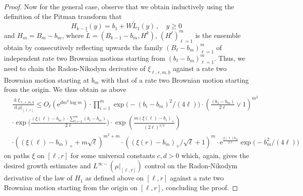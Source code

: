 \documentclass[11pt, reqno]{amsart}
\numberwithin{equation}{section}
\newcommand{\diff}{\ensuremath{\operatorname{d}\!}}
\begin{document}
\begin{proof}
    Now for the general case, observe that we obtain inductively using the definition of the Pitman transform that
     \[
H_{k-1}(y) = b_1 + W\tilde{L}_1(y)\,,\quad y\ge 0
    \]
    and $H_m = B_m-b_m$, where $\tilde{L} = (B_{k-1}-b_m, H^{k})$, $(H^{\ell})^m_{\ell=1}$ is the ensemble obtain by consecutively reflecting upwards the family $(B_\ell-b_m)_{\ell=1}^m$ of independent rate two Brownian motions starting from $(b_\ell-b_m)_{\ell=1}^m$. Thus, we need to chain the Radon-Nikodym  derivative of $\xi_{\ell, r, m, \underline{b}}$ against a rate two Brownian motion starting at $b_m$ with that of a rate two Brownian motion starting from the origin. We thus obtain as above
     \begin{equation*}
        \begin{array}{cc}
             & \frac{\diff \xi_{\ell, r, m, \underline{b}}}{\diff\mu\vert_{[\ell, r]}} \le  O_\ell(\mathrm{e}^{dm^2\log m})\cdot\displaystyle\prod^m_{i=1}\exp\big(-(b_i-b_m)^2/(4\ell)\big)\cdot \left(\frac{(b_1-b_m)}{2\ell}\lor 1\right)^{m^2}\\
             & \cdot \exp\big(\frac{(\xi(\ell)-b_m) \cdot\sum_{i=1}^m(b_i-b_m)}{2\ell}\big)\cdot \exp\left(\frac{m(\xi(\ell)-b_1)_+}{(2\ell)^{1/2}}\right)\\
             & \cdot ((\xi(\ell)-b_m)_++ m\sqrt{\ell})^{m^2+m}\cdot ((\xi(r)-b_m)_+/\sqrt{\ell}+1)^m\cdot \mathrm{e}^{\frac{\xi(\ell)b_m}{2\ell}}\exp\big(-b_m^2/(4\ell)\big)
        \end{array}
    \end{equation*}
    on paths $\xi$ on $[\ell, r]$ for some universal constants $c, d> 0$ which, again, gives the desired growth estimates and $L^{\infty-}(\mu\vert_{[\ell, r]})$ control on the Radon-Nikodym  derivative of the law of $H_1$ as defined above on $[\ell, r]$ against a rate two Brownian motion starting from the origin on $[\ell,r]$, concluding the proof.
\end{proof}
\end{document}
